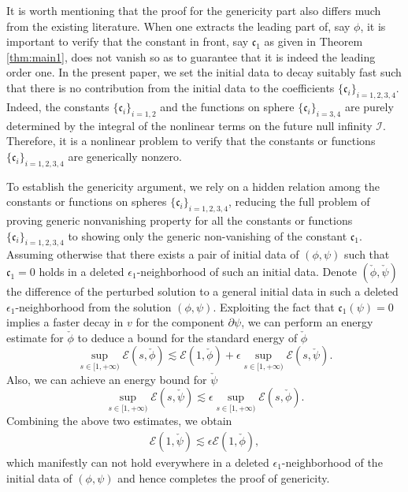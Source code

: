 \documentclass[a4paper,reqno]{amsart}
\theoremstyle{definition}
\numberwithin{equation}{section}
\def\cfrak{\mathfrak{c}}
\begin{document}
 
  


It is worth mentioning that the proof for the genericity part also differs much from the existing literature. When one extracts the leading part of, say $\phi$, it is important to verify that the constant in front, say $\mathfrak{c}_1$ as given in Theorem \ref{thm:main1}, does not vanish so as to guarantee that it is indeed the leading order one. In the present paper, we set the initial data to decay suitably fast such that there is no contribution from the initial data to the coefficients $\{\mathfrak{c}_i\}_{i=1,2,3,4}$. Indeed, the constants $\{\mathfrak{c}_i\}_{i=1,2}$ and the functions on sphere $\{\mathfrak{c}_i\}_{i=3,4}$ are purely determined by the integral of the nonlinear terms on the future null infinity $\mathcal{I}$. Therefore, it is a nonlinear problem to verify that the constants or functions $\{\mathfrak{c}_i\}_{i=1,2,3,4}$ are generically nonzero.
 
 
 To establish the genericity argument, we rely on a hidden relation among the constants or functions on spheres $\{\mathfrak{c}_i\}_{i=1,2,3,4}$, reducing the full problem of proving generic nonvanishing property for all the constants or functions $\{\mathfrak{c}_i\}_{i=1,2,3,4}$ to showing only the generic non-vanishing of the constant $\mathfrak{c}_1$. Assuming otherwise that there exists a pair of initial data of $(\phi,\psi)$ such that $\cfrak_1=0$ holds in a deleted $\epsilon_1$-neighborhood of such an initial data. Denote $(\check{\phi},\check{\psi})$  the difference of the perturbed solution to a general initial data in such a deleted $\epsilon_1$-neighborhood from the solution $(\phi,\psi)$.  Exploiting the fact that $\mathfrak{c}_1(\psi)=0$ implies a faster decay in $v$ for the component $\partial \psi$, we can perform an energy estimate for $\check{\phi}$ to deduce a bound for the standard energy of $\check{\phi}$
\begin{equation*}
    \sup_{s\in [1, +\infty)} \mathcal{E}(s, \check{\phi})
    \lesssim
    \mathcal{E}(1, \check{\phi})
    +
    \epsilon \sup_{s\in [1, +\infty)} \mathcal{E}(s, \check{\psi}).
\end{equation*}
Also, we can achieve an energy bound for $\check{\psi}$
 \begin{equation*}
    \sup_{s\in [1, +\infty)} \mathcal{E}(s, \check{\psi})
    \lesssim
    \epsilon \sup_{s\in [1, +\infty)} \mathcal{E}(s, \check{\phi}).
\end{equation*}
Combining the above two estimates, we obtain
\begin{align*}
  \mathcal{E}(1, \check{\psi})
    \lesssim
    \epsilon \mathcal{E}(1, \check{\phi}),
\end{align*}
which manifestly can not hold everywhere in a deleted $\epsilon_1$-neighborhood of the initial data of $(\phi,\psi)$ and hence completes the proof of genericity.
\end{document}
